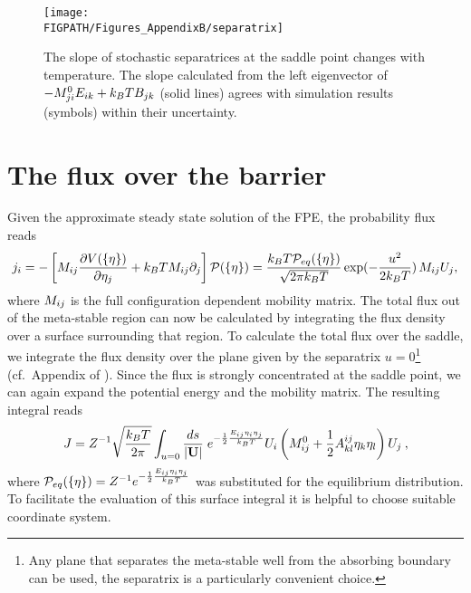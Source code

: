 \begin{figure}
\centering
\texttt{[image: \\FIGPATH/Figures\_AppendixB/separatrix]}
\caption[The effect of noise-induced drift on the stochastic separatrix.]
{\label{fig:separatrix} The slope of stochastic separatrices at the saddle point changes with temperature. The slope 
calculated from the left eigenvector of $-M_{ji}^0E_{ik}  + k_BT B_{jk}$ (solid lines) agrees with simulation results (symbols) within their uncertainty.}
\end{figure}


\section{The flux over the barrier}
Given the approximate steady state solution of the FPE, the probability flux reads
\begin{equation}
j_i=-\left[M_{ij}\frac{\partial V(\{\eta\})}{\partial \eta_j}+k_BTM_{ij} \partial_j \right]{\cal P}(\{\eta\})=\frac{k_BT {\cal P}_{eq}(\{\eta\})}{\sqrt{2\pi k_BT}}\exp(-\frac{u^2}{2k_BT}) \,M_{ij} U_j,
\end{equation}
where $M_{ij}$ is the full configuration dependent mobility matrix. The total flux out of the 
meta-stable region can now be calculated by integrating the flux density over a surface
surrounding that region. To calculate the total flux over the saddle, we integrate the flux density over
the plane given by the separatrix $u=0$\footnote{Any plane that separates the meta-stable well from
the absorbing boundary can be used, the separatrix is a particularly convenient choice.} (cf.~Appendix of ). Since the flux is strongly concentrated at the saddle point, 
we can again expand the potential energy and the mobility matrix. The resulting integral reads
\begin{equation}
J=Z^{-1}\sqrt{\frac{k_BT}{2\pi}}\int_{u=0}\frac{ds}{|\mathbf{U}|} \;e^{-\frac{1}{2}\frac{E_{ij}\eta_i\eta_j}{k_BT}}U_i\left(M^0_{ij}+\frac{1}{2}A^{ij}_{kl}\eta_k\eta_l\right) U_j\:,
\end{equation}
where ${\cal P}_{eq}(\{\eta\})=Z^{-1}e^{-\frac{1}{2}\frac{E_{ij}\eta_i\eta_j}{k_BT}}$ was substituted for the equilibrium 
distribution.
To facilitate the evaluation of this surface integral it is helpful to choose suitable coordinate system. 
